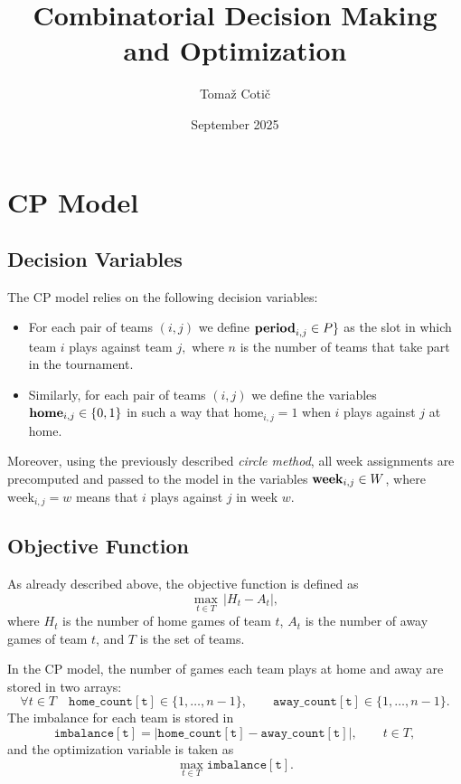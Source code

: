 \documentclass{article}
\title{Combinatorial Decision Making and Optimization}
\author{Tomaž Cotič}
\date{September 2025}
\begin{document}

\section{CP Model}

\subsection{Decision Variables}
The CP model relies on the following decision variables:

\begin{itemize}
    \item For each pair of teams $(i,j)$ we define $\text{\textbf{period}}_{i,j} \in P\}$ as the slot in which team $i$ plays against team $j,$ where $n$ is the number of teams that take part in the tournament.
    \item Similarly, for each pair of teams $(i,j)$ we define the variables $\text{\textbf{home}}_{i,j}\in \{0, 1\}$ in such a way that $\text{home}_{i,j}=1$ when $i$ plays against $j$ at home.
\end{itemize}

Moreover, using the previously described \emph{circle method}, all week assignments are precomputed and passed to the model in the variables $\text{\textbf{week}}_{i,j} \in W$, where $\text{week}_{i,j} = w$ means that $i$ plays against $j$ in week $w$.

\subsection{Objective Function}
As already described above, the objective function is defined as
\[
\max_{t \in T} \, |H_t - A_t|,
\]
where \(H_t\) is the number of home games of team \(t\), \(A_t\) is the number of away games of team \(t\), and \(T\) is the set of teams.

In the CP model, the number of games each team plays at home and away are stored in two arrays:
\[
\forall t \in T \quad \mathtt{home\_count[t]} \in \{1, \dots, n-1\}, 
\qquad
\mathtt{away\_count[t]} \in \{1, \dots, n-1\}.
\]
The imbalance for each team is stored in
\[
\mathtt{imbalance[t]} = \lvert \mathtt{home\_count[t]} - \mathtt{away\_count[t]} \rvert,
\qquad t \in T,
\]
and the optimization variable is taken as
\[
\max_{t \in T} \mathtt{imbalance[t]}.
\]
\end{document}
